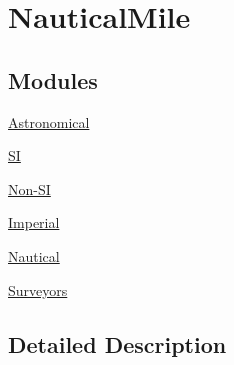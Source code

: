 \hypertarget{group___e_g_x_math-_conversions-_length_conversions-_non-_s_i-_nautical_mile}{}\section{Nautical\+Mile}
\label{group___e_g_x_math-_conversions-_length_conversions-_non-_s_i-_nautical_mile}
\subsection*{Modules}
\begin{DoxyCompactItemize}
\item 
\mbox{\hyperlink{group___e_g_x_math-_conversions-_length_conversions-_non-_s_i-_nautical_mile-_astronomical}{Astronomical}}
\item 
\mbox{\hyperlink{group___e_g_x_math-_conversions-_length_conversions-_non-_s_i-_nautical_mile-_s_i}{SI}}
\item 
\mbox{\hyperlink{group___e_g_x_math-_conversions-_length_conversions-_non-_s_i-_nautical_mile-_non-_s_i}{Non-\/\+SI}}
\item 
\mbox{\hyperlink{group___e_g_x_math-_conversions-_length_conversions-_non-_s_i-_nautical_mile-_imperial}{Imperial}}
\item 
\mbox{\hyperlink{group___e_g_x_math-_conversions-_length_conversions-_non-_s_i-_nautical_mile-_nautical}{Nautical}}
\item 
\mbox{\hyperlink{group___e_g_x_math-_conversions-_length_conversions-_non-_s_i-_nautical_mile-_surveyors}{Surveyors}}
\end{DoxyCompactItemize}


\subsection{Detailed Description}
